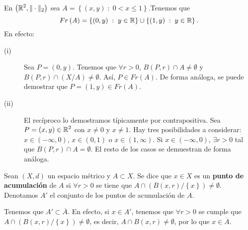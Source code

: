 \begin{eg}
	En $\displaystyle \left(\mathbb{R}^{2}, \| \cdot \|_{2}\right) $ sea $\displaystyle A = \left\{ \left(x,y\right) \; : \; 0 < x \leq 1\right\}  $.Tenemos que  
	\[ Fr\left(A\right) = \left\{ \left(0,y\right)\; : \; y \in \mathbb{R}\right\} \cup \left\{ \left(1,y\right) \; : \; y \in \mathbb{R}\right\} .\]
	En efecto:
	\begin{description}
	\item[(i)] Sea $\displaystyle P = \left(0,y\right) $. Tenemos que $\displaystyle \forall r > 0 $, $\displaystyle B\left(P,r\right) \cap A \neq \emptyset $ y $\displaystyle B\left(P,r\right)\cap \left(X/A\right) \neq \emptyset $. Así, $\displaystyle P \in Fr\left(A\right) $. De forma análoga, se puede demostrar que $\displaystyle P = \left(1,y\right) \in Fr\left(A\right) $.
	\item[(ii)] El recíproco lo demostramos típicamente por contrapositiva. Sea $\displaystyle P = \left(x,y\right) \in \mathbb{R}^{2} $ con $\displaystyle x \neq 0 $ y $\displaystyle x \neq 1 $. Hay tres posibilidades a considerar: $\displaystyle x \in \left(-\infty, 0\right) $, $\displaystyle x \in \left(0,1\right) $ o $\displaystyle x \in \left(1,\infty\right) $. Si $\displaystyle x \in \left(-\infty, 0\right) $, $\displaystyle \exists r > 0 $ tal que $\displaystyle B\left(P,r\right) \cap A = \emptyset $. El resto de los casos se demuestran de forma análoga.
	\end{description}
\end{eg}
\begin{definition}
	Sean $\displaystyle \left(X,d\right) $ un espacio métrico y $\displaystyle A \subset X $. Se dice que $\displaystyle x \in X $ es un \textbf{punto de acumulación} de $\displaystyle A $ si $\displaystyle \forall r> 0 $ se tiene que $\displaystyle A \cap \left(B\left(x,r\right)/ \left\{ x\right\} \right)\neq \emptyset $. Denotamos $\displaystyle A' $ el conjunto de los puntos de acumulación de $\displaystyle A $.
\end{definition}
\begin{observation}
	Tenemos que $\displaystyle A' \subset \overline{A} $. En efecto, si $\displaystyle x \in A' $, tenemos que $\displaystyle \forall r > 0 $ se cumple que $\displaystyle A \cap \left(B\left(x,r\right) / \left\{ x\right\} \right) \neq \emptyset $, es decir, $\displaystyle A \cap B\left(x,r\right) \neq \emptyset $, por lo que $\displaystyle x \in \overline{A} $.
\end{observation}
